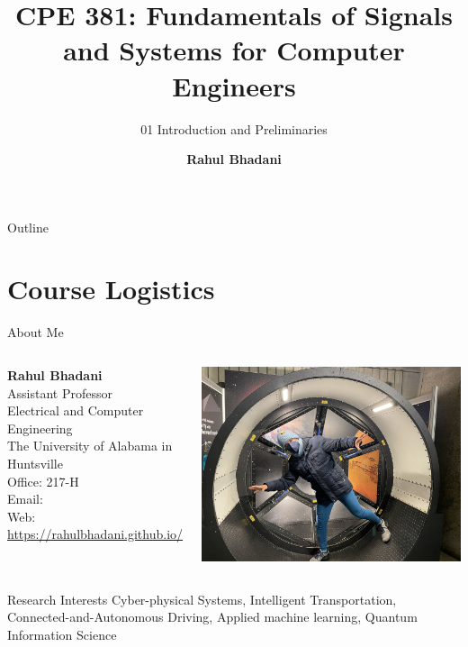 \documentclass[aspectratio=169,xcolor=dvipsnames,svgnames,x11names,fleqn]{beamer}
\title[CPE 381: Signals and Systems]{CPE 381: Fundamentals of Signals and Systems for Computer Engineers} %
\subtitle{01 Introduction and Preliminaries}
\author[Rahul Bhadani] {{\Large \textbf{Rahul Bhadani}}}
\institute[UAH] %
{
    Electrical \& Computer Engineering,  The University of Alabama in Huntsville
}
\date
\begin{document}
\begin{frame}
  \titlepage
\end{frame}

\begin{frame}{Outline}
   \tableofcontents
\end{frame}

\section{Course Logistics}

\begin{frame}{About Me}
    \begin{columns}[c] %

        \textbf{Rahul Bhadani} \\
        Assistant Professor \\
        Electrical and Computer Engineering \\
        The University of Alabama in Huntsville \\
        Office: 217-H \\
        Email: {\color{MediumRed}{rahul.bhadani@uah.edu}} \\
        Web: {\color{MediumRed}\url{https://rahulbhadani.github.io/}}

        \includegraphics[width=.89\textwidth]{figures/intro_rkb.jpg}
    \end{columns}
    
    \begin{block}{Research Interests}
    Cyber-physical Systems,
    Intelligent Transportation, 
    Connected-and-Autonomous Driving, 
    Applied machine learning,
    Quantum Information Science
    \end{block}
\end{frame}
\end{document}
